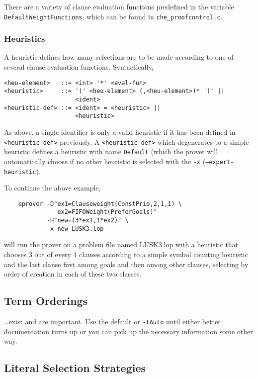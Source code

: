 \documentclass{article}
\begin{document}
There are a variety of clause evaluation functions predefined in
the variable \texttt{DefaultWeightFunctions}, which can be found in
\texttt{che\_proofcontrol.c}. 

\subsubsection{Heuristics}

A heuristic defines how many selections are to be made according to
one of several clause evaluation functions. Syntactically,

\begin{verbatim}
<heu-element>   ::= <int> '*' <eval-fun>
<heuristic>     ::= '(' <heu-element> (,<heu-element>)* ')' ||
                    <ident>
<heuristic-def> ::= <ident> = <heuristic> ||
                    <heuristic>
\end{verbatim}

As above, a single identifier is only a valid heuristic if it has been
defined in \texttt{<heuristic-def>} previously. A
\texttt{<heuristic-def>} which degenerates to a simple heuristic
defines a heuristic with name \texttt{Default} (which the prover will
automatically choose if no other heuristic is selected with the
\texttt{-x} (\texttt{--expert-heuristic}).

\begin{example}
  To continue the above example,
\begin{verbatim}
    eprover -D"ex1=Clauseweight(ConstPrio,2,1,1) \
               ex2=FIFOWeight(PreferGoals)" 
            -H"new=(3*ex1,1*ex2)" \
            -x new LUSK3.lop
\end{verbatim}
  will run the prover on a problem file named LUSK3.lop with a
  heuristic that chooses 3 out of every 4 clauses according to a
  simple symbol counting heuristic and the last clause first among
  goals and then among other clauses, selecting by order of creation
  in each of these two classes.
\end{example}


\subsection{Term Orderings}
\label{sec:options:orderings}

\ldots exist and are important. Use the default or \texttt{-tAuto}
until either better documentation turns up or you can pick up the
necessary information some other way.

\subsection{Literal Selection Strategies}
\label{sec:options:strategies}
\end{document}
